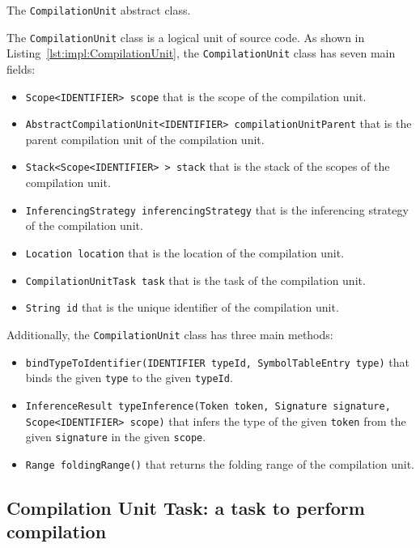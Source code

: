 \begin{Listing}[tbh]
    \centering
    \caption{The \texttt{CompilationUnit} abstract class.}
    \label{lst:impl:CompilationUnit}
\end{Listing}

The \texttt{CompilationUnit} class is a logical unit of source code. As shown in Listing~\ref{lst:impl:CompilationUnit}, the \texttt{CompilationUnit} class has seven main fields:
\begin{itemize}
    \item \texttt{Scope<IDENTIFIER> scope} that is the scope of the compilation unit.
    \item \texttt{AbstractCompilationUnit<IDENTIFIER> compilationUnitParent} that is the parent compilation unit of the compilation unit.
    \item \texttt{Stack<Scope<IDENTIFIER> > stack} that is the stack of the scopes of the compilation unit.
    \item \texttt{InferencingStrategy inferencingStrategy} that is the inferencing strategy of the compilation unit.
    \item \texttt{Location location} that is the location of the compilation unit.
    \item \texttt{CompilationUnitTask task} that is the task of the compilation unit.
    \item \texttt{String id} that is the unique identifier of the compilation unit.
\end{itemize}

Additionally, the \texttt{CompilationUnit} class has three main methods:
\begin{itemize}
    \item \texttt{bindTypeToIdentifier(IDENTIFIER typeId, SymbolTableEntry type)} that binds the given \texttt{type} to the given \texttt{typeId}.
    \item \texttt{InferenceResult typeInference(Token token, Signature signature, Scope<IDENTIFIER> scope)} that infers the type of the given \texttt{token} from the given \texttt{signature} in the given \texttt{scope}.
    \item \texttt{Range foldingRange()} that returns the folding range of the compilation unit.
\end{itemize}


\subsection{Compilation Unit Task: a task to perform compilation}\label{subsec:impl:CompilationUnitTask}

